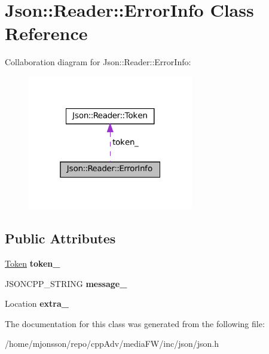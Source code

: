 \hypertarget{classJson_1_1Reader_1_1ErrorInfo}{}\section{Json\+:\+:Reader\+:\+:Error\+Info Class Reference}
\label{classJson_1_1Reader_1_1ErrorInfo}


Collaboration diagram for Json\+:\+:Reader\+:\+:Error\+Info\+:
\nopagebreak
\begin{figure}[H]
\begin{center}
\leavevmode
\includegraphics[width=205pt]{classJson_1_1Reader_1_1ErrorInfo__coll__graph}
\end{center}
\end{figure}
\subsection*{Public Attributes}
\begin{DoxyCompactItemize}
\item 
\mbox{\label{classJson_1_1Reader_1_1ErrorInfo_a52e1c71b12eb1c3f0395d7ef1e778ce6}} 
\hyperlink{classJson_1_1Reader_1_1Token}{Token} {\bfseries token\+\_\+}
\item 
\mbox{\label{classJson_1_1Reader_1_1ErrorInfo_a3529d420f7c83165565bf294a5d6ed13}} 
J\+S\+O\+N\+C\+P\+P\+\_\+\+S\+T\+R\+I\+NG {\bfseries message\+\_\+}
\item 
\mbox{\label{classJson_1_1Reader_1_1ErrorInfo_af92c24acf642b040d6e40aac4952d44d}} 
Location {\bfseries extra\+\_\+}
\end{DoxyCompactItemize}


The documentation for this class was generated from the following file\+:\begin{DoxyCompactItemize}
\item 
/home/mjonsson/repo/cpp\+Adv/media\+F\+W/inc/json/json.\+h\end{DoxyCompactItemize}
